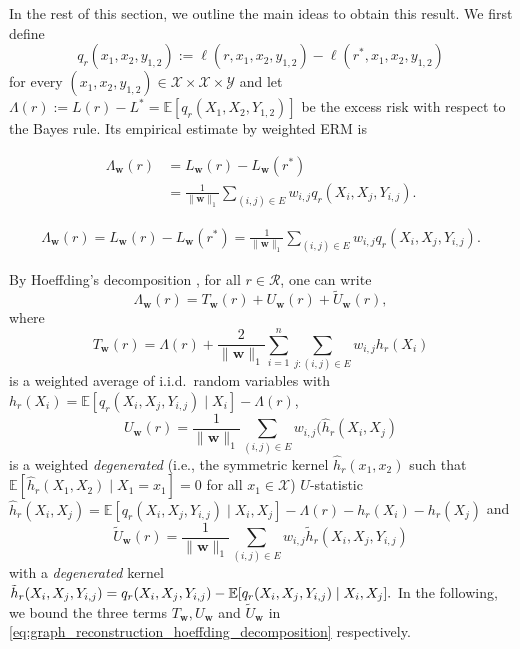 \documentclass[letterpaper]{article} %
\def\DoubleColumn{}
\def\DoubleColumnEnd{}
\def\SingleColumn{}
\def\SingleColumnEnd{}
\newcommand{\E}{\mathbb{E}}
\newcommand{\weight}{\mathbf{w}}
\newcommand{\xspace}{\mathcal{X}}
\newcommand{\yspace}{\mathcal{Y}}
\newcommand{\bayeserror}{L^*}
\newcommand{\empiricalrisk}[1]{L_{#1}}
\newcommand{\risk}{L}
\newcommand{\lossf}{\ell}
\newcommand{\pair}[1]{(#1)}
\newcommand{\normo}[1]{\|#1\|_1}
\newcommand{\red}[1]{\textcolor{red}{#1}}
\newcommand{\todo}[1]{\red{\textsc{todo:} #1}}
\begin{document}
In the rest of this section, we outline the main ideas to obtain this result.
We first define
\[q_r(x_1,x_2,y_{1,2}):=\lossf(r, x_1,x_2,y_{1,2})-\lossf(r^*,x_1,x_2,y_{1,2})\]
for every $(x_1,x_2,y_{1,2})\in \mathcal X\times\mathcal X\times\yspace{}$ and let $\Lambda(r) := \risk(r)-\bayeserror=\E[q_r(X_1,X_2,Y_{1,2})]$
be the excess risk with respect to the Bayes rule.
Its empirical estimate by weighted ERM is 
\DoubleColumn
\begin{align*}
    \Lambda_\weight{}(r) &= \empiricalrisk{\weight{}}(r)-\empiricalrisk{\weight{}}(r^*)\\
    &=\frac{1}{\normo{\weight{}}}\sum_{\pair{i,j}\in E} w_{i,j} q_r(X_i,X_j,Y_{i,j}).
\end{align*}
\DoubleColumnEnd
\SingleColumn
\begin{align*}
    \Lambda_\weight{}(r) = \empiricalrisk{\weight{}}(r)-\empiricalrisk{\weight{}}(r^*)=\frac{1}{\normo{\weight{}}}\sum_{\pair{i,j}\in E} w_{i,j} q_r(X_i,X_j,Y_{i,j}).
\end{align*}
\SingleColumnEnd

By Hoeffding's decomposition \cite{hoeffding1948class}, for all $r\in\mathcal R$, one can write
\begin{equation}
    \label{eq:graph_reconstruction_hoeffding_decomposition}
    \Lambda_\weight{}(r) = T_\weight{}(r) + U_\weight{}(r) + \widetilde{U}_\weight{}(r),
\end{equation}
where
\[T_\weight{}(r)=\Lambda(r)+\frac{2}{\normo{\weight{}}}\sum_{i=1}^n\sum_{j:\pair{i,j}\in E}w_{i,j}h_r(X_i)\]
is a weighted average of i.i.d.\ random variables with $h_r(X_i)=\E[q_r(X_i,X_j,Y_{i,j})\mid X_i]-\Lambda(r)$,
\[U_\weight{}(r)=\frac{1}{\normo{\weight{}}}\sum_{\pair{i,j}\in E} w_{i,j}(\hat{h}_r(X_i,X_j)\]
is a weighted \emph{degenerated} (i.e., the symmetric kernel $\hat{h}_r(x_1,x_2)$ such that $\E[\hat{h}_r(X_1, X_2)\mid X_1=x_1]=0$ for all $x_1\in\xspace{}$) $U$-statistic 
$\hat{h}_r(X_i,X_j)=\E[q_r(X_i,X_j,Y_{i,j})\mid X_i,X_j]-\Lambda(r)-h_r(X_i)-h_r(X_j)$ 
and
\[\widetilde{U}_\weight{}(r)=\frac{1}{\normo{\weight{}}}\sum_{\pair{i,j}\in E}w_{i,j}\tilde{h}_r(X_i,X_j,Y_{i,j})\]
with a \emph{degenerated} kernel 
$\tilde{h}_r(X_i,X_j,Y_{i,j})=q_r(X_i,X_j\linebreak,Y_{i,j})-\E[q_r(X_i,X_j,Y_{i,j})\mid X_i,X_j].$ 
In the following, we bound the three terms $T_\weight{}, U_\weight{}$ and $\widetilde{U}_\weight{}$ in \eqref{eq:graph_reconstruction_hoeffding_decomposition} respectively. 
\end{document}
